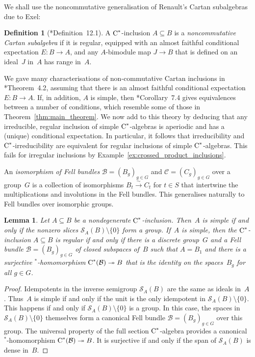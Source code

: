 \documentclass[a4paper]{amsart}
\theoremstyle{plain}
\newtheorem{lemma}[theorem]{Lemma}
\theoremstyle{definition}
\newtheorem{definition}[theorem]{Definition}
\theoremstyle{remark}
\numberwithin{theorem}{section}
\numberwithin{equation}{section}
\newcommand*{\nb}{\nobreakdash}
\newcommand*{\Star}{\(^*\)\nobreakdash-}
\newcommand*{\Cst}{\textup C^*}%
\newcommand*{\Slice}{\mathcal S}%
\newcommand*{\B}{\mathcal B}%
\newcommand*{\congto}{\xrightarrow\sim}
\newcommand*{\onto}{\twoheadrightarrow}
\begin{document}
We shall use the noncommutative generalisation of Renault's Cartan
subalgebras due to Exel:

\begin{definition}[\cite{Exel:noncomm.cartan}*{Definition~12.1}]
  \label{def:virtual_commutant}
  A \(\Cst\)\nb-inclusion \(A\subseteq B\) is a \emph{noncommutative
    Cartan subalgebra} if it is regular, equipped with an almost
  faithful conditional expectation \(E\colon B\to A\), and any
  \(A\)\nb-bimodule map \(J\to B\) that is defined on an ideal~\(J\)
  in~\(A\) has range in~\(A\).
\end{definition}

We gave many characterisations of non-commutative Cartan inclusions in
\cite{Kwasniewski-Meyer:Cartan}*{Theorem~4.2}, assuming that there is
an almost faithful conditional expectation \(E\colon B\to A\).
If, in addition, \(A\) is simple, then
\cite{Kwasniewski-Meyer:Cartan}*{Corollary~7.4} gives equivalences
between a number of conditions, which resemble some of those in
Theorem~\ref{thm:main_theorem}.
We now add to this theory by deducing that any irreducible, regular
inclusion of simple \(\Cst\)\nb-algebras is aperiodic and has a
(unique) conditional expectation.
In particular, it follows that irreducibility and
\(\Cst\)\nb-irreducibility are equivalent for regular inclusions of
simple \(\Cst\)\nb-algebras.
This fails for irregular inclusions by
Example~\ref{ex:crossed_product_inclusions}.

An \emph{isomorphism of Fell bundles} \(\B= (B_g)_{g\in G}\) and
\(\mathcal{C}= (C_g)_{g\in G}\) over a group~\(G\) is a collection of
isomorphisms \(B_t\congto C_t\) for \(t\in S\) that intertwine the
multiplications and involutions in the Fell bundles.
This generalises naturally to Fell bundles over isomorphic groups.

\begin{lemma}
  \label{lem:regular_vs_grading}
  Let \(A\subseteq B\) be a nondegenerate \(\Cst\)\nb-inclusion.
  Then~\(A\) is simple if and only if the nonzero slices
  \(\Slice_A(B)\setminus \{0\}\) form a group.
  If~\(A\) is simple, then the \(\Cst\)\nb-inclusion \(A\subseteq B\)
  is regular if and only if there is a discrete group~\(G\) and a Fell
  bundle \(\B=(B_g)_{g\in G}\) of closed subspaces of~\(B\) such that
  \(A=B_1\) and there is a surjective \Star{}homomorphism
  \(\Cst(\B)\onto B\) that is the identity on the spaces~\(B_g\) for
  all \(g\in G\).
\end{lemma}

\begin{proof}
  Idempotents in the inverse semigroup \(\Slice_A(B)\) are the same as
  ideals in~\(A\).
  Thus~\(A\) is simple if and only if the unit is the only idempotent
  in \(\Slice_A(B)\setminus \{0\}\).
  This happens if and only if \(\Slice_A(B)\setminus \{0\}\) is a
  group.
  In this case, the spaces in \(\Slice_A(B)\setminus \{0\}\)
  themselves form a canonical Fell bundle \(\B=(B_g)_{g\in G}\) over
  this group.
  The universal property of the full section \(\Cst\)\nb-algebra
  provides a canonical \Star{}homomorphism \(\Cst(\B)\onto B\).
  It is surjective if and only if the span of \(\Slice_A(B)\)  is
  dense in~\(B\).
\end{proof}
\end{document}

